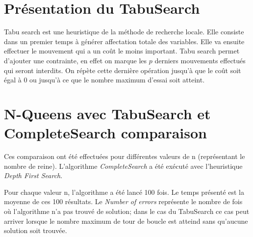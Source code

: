 \documentclass[a4paper,10pt]{article}
\begin{document}
\section{Présentation du TabuSearch}
Tabu search est une heuristique de la méthode de recherche locale. Elle consiste dans un premier temps à générer affectation totale des variables. Elle va ensuite effectuer le mouvement qui a un coût le moins important. Tabu search permet d'ajouter une contrainte, en effet on marque les $p$ derniers mouvements effectués qui seront interdits. On répète cette dernière opération jusqu'à que le coût soit égal à 0 ou jusqu'à ce que le nombre maximum d'essai soit atteint.

\section{N-Queens avec TabuSearch et CompleteSearch comparaison}

Ces comparaison ont été effectuées pour différentes valeurs de n (représentant le nombre de reine). L'algorithme \emph{CompleteSearch} a été exécuté avec l'heuristique \emph{Depth First Search}.

Pour chaque valeur n, l'algorithme a été lancé 100 fois. Le temps présenté est la moyenne de ces 100 résultats. Le \emph{Number of errors} représente le nombre de fois où l'algorithme n'a pas trouvé de solution; dans le cas du TabuSearch ce cas peut arriver lorsque le nombre maximum de tour de boucle est atteind sans qu'aucune solution soit trouvée. \newline
\end{document}
